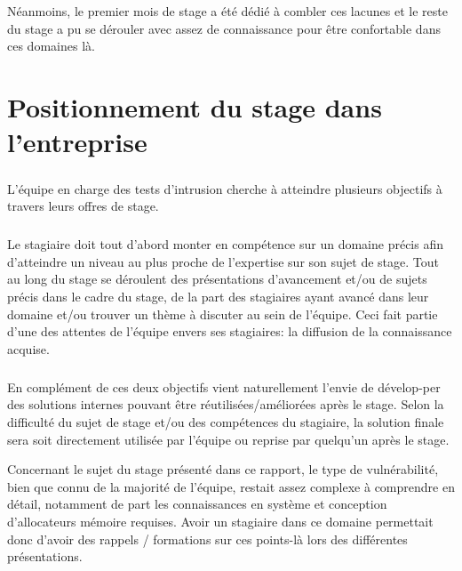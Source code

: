 Néanmoins, le premier mois de stage a été dédié à combler ces lacunes et le reste du stage a pu se dérouler avec assez de connaissance
pour être confortable dans ces domaines là.

\subparagraph{}


\section*{Positionnement du stage dans l'entreprise}
\paragraph{}
\subparagraph{}
L'équipe en charge des tests d'intrusion cherche à atteindre plusieurs objectifs à travers leurs offres de stage.
\subparagraph{}
Le stagiaire doit tout d'abord monter en compétence sur un domaine précis afin d'atteindre un niveau au plus proche de l'expertise sur son sujet de stage.\newline
Tout au long du stage se déroulent des présentations d'avancement et/ou de sujets précis dans le cadre du stage, de la part des stagiaires ayant avancé dans leur domaine
et/ou trouver un thème à discuter au sein de l'équipe. Ceci fait partie d'une des attentes de l'équipe envers ses stagiaires: la diffusion de la connaissance acquise.
\subparagraph{}
En complément de ces deux objectifs vient naturellement l'envie de dévelop-per des solutions internes pouvant être réutilisées/améliorées après le stage. Selon la difficulté du sujet de stage
et/ou des compétences du stagiaire, la solution finale sera soit directement utilisée par l'équipe ou reprise par quelqu'un après le stage.\newline

Concernant le sujet du stage présenté dans ce rapport, le type de vulnérabilité, bien que connu de la majorité de l'équipe, restait assez complexe à comprendre en détail,
notamment de part les connaissances en système et conception d'allocateurs mémoire requises. Avoir un stagiaire dans ce domaine permettait donc d'avoir des
rappels / formations sur ces points-là lors des différentes présentations.
